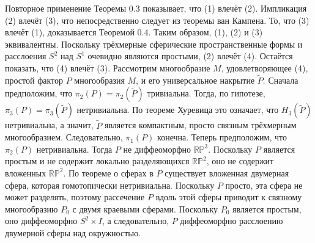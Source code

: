 \begin{myproof} 
Повторное применение Теоремы 0.3 показывает, что (1) влечёт (2). 
Импликация (2) влечёт (3), что непосредственно следует из теоремы ван Кампена. То, что 
(3) влечёт (1), доказывается Теоремой 0.4. Таким образом, (1), (2) и (3) эквивалентны.
Поскольку трёхмерные сферические пространственные формы и расслоения $S^{2}$ над $S^{1}$ 
очевидно являются простыми, (2) влечёт (4). Остаётся показать, что (4) влечёт (3).
Рассмотрим многообразие $M$, удовлетворяющее (4), простой фактор $P$ многообразия $M$, и его 
универсальное накрытие $\tilde{P}$.
Сначала предположим, что $\pi_{2} (P)=\pi_{2} (\tilde{P})$ тривиальна. Тогда, по гипотезе,
$\pi_{3} (P)=\pi_{3} (\tilde{P})$ нетривиальна. По теореме Хуревица это означает, что 
$H_{3} (\tilde{P})$ нетривиальна, а значит, $\tilde{P}$ является компактным, просто связным 
трёхмерным многообразием. Следовательно, $\pi_{1} (P)$ конечна.
Теперь предположим, что $\pi_{2} (P)$ нетривиальна. Тогда $P$ не диффеоморфно $\mathbb{RP}^3$. 
Поскольку $P$ является простым и не содержит локально разделяющихся $\mathbb{RP}^2$, оно не содержит 
вложенных $\mathbb{RP}^2$. По теореме о сферах в $P$ существует вложенная двумерная сфера, которая 
гомотопически нетривиальна. Поскольку $P$ просто, эта сфера не может разделять, поэтому 
рассечение $P$ вдоль этой сферы приводит к связному многообразию $P_{0}$ с двумя краевыми сферами. 
Поскольку $P_{0}$ является простым, оно диффеоморфно $S^{2} \times I$, а следовательно, 
$P$ диффеоморфно расслоению двумерной сферы над окружностью.
\end{myproof}

